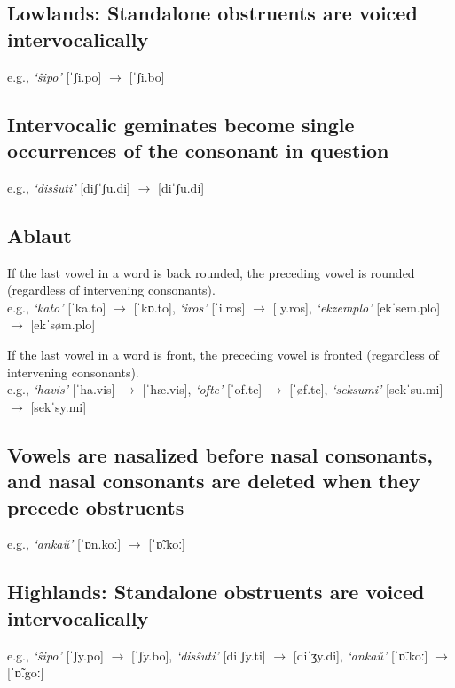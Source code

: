 \documentclass[a4paper,11pt,article,oneside]{memoir}
\newcommand{\bripa}[1]{[#1]}
\newcommand{\espq}[1]{\textit{`#1'}}
\newcommand{\esh}{ʃ}
\newcommand{\ezh}{ʒ}
\newcommand{\aesh}{æ}
\newcommand{\ahoh}{ɒ}
\newcommand{\lgth}{ː}
\newcommand{\prstr}{ˈ}
\begin{document}
\subsection{{\sc Lowlands:} Standalone obstruents are voiced intervocalically} 

e.g., \espq{\^{s}ipo} \bripa{\prstr\esh i.po} $\to$ \bripa{\prstr\esh i.bo} 

\subsection{Intervocalic geminates become single occurrences of the consonant in question}

e.g., \espq{dis\^{s}uti} \bripa{di\esh\prstr\esh u.di} $\to$ \bripa{di\prstr\esh u.di}

\subsection{Ablaut}

If the last vowel in a word is back rounded, the preceding vowel is rounded (regardless of intervening consonants).\\
e.g., \espq{kato} \bripa{\prstr ka.to} $\to$ \bripa{\prstr k\ahoh.to}, \espq{iros} \bripa{\prstr i.ros} $\to$ \bripa{\prstr y.ros}, \espq{ekzemplo} \bripa{ek\prstr sem.plo} $\to$ \bripa{ek\prstr søm.plo}

If the last vowel in a word is front, the preceding vowel is fronted (regardless of intervening consonants).\\
e.g., \espq{havis} \bripa{\prstr ha.vis} $\to$ \bripa{\prstr h\aesh.vis}, \espq{ofte} \bripa{\prstr of.te} $\to$ \bripa{\prstr øf.te}, \espq{seksumi} \bripa{sek\prstr su.mi} $\to$ \bripa{sek\prstr sy.mi}

\subsection{Vowels are nasalized before nasal consonants, and nasal consonants are deleted when they precede obstruents}

e.g., \espq{anka\u{u}} \bripa{\prstr\ahoh n.ko\lgth} $\to$ \bripa{\prstr\~{\ahoh}.ko\lgth}

\subsection{{\sc Highlands:} Standalone obstruents are voiced intervocalically}

e.g., \espq{\^{s}ipo} \bripa{\prstr\esh y.po} $\to$ \bripa{\prstr\esh y.bo}, \espq{dis\^{s}uti} \bripa{di\prstr\esh y.ti} $\to$ \bripa{di\prstr\ezh y.di}, \espq{anka\u{u}} \bripa{\prstr\~{\ahoh}.ko\lgth} $\to$ \bripa{\prstr\~{\ahoh}.go\lgth}
\end{document}
